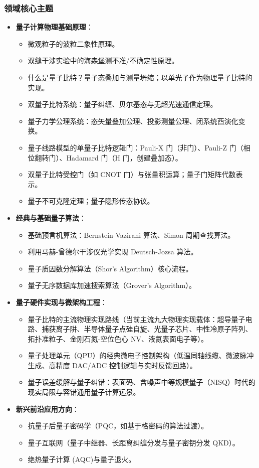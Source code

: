 \subsubsection{领域核心主题}
\begin{itemize}
    \item \textbf{量子计算物理基础原理}：
    \begin{itemize}
        \item 微观粒子的波粒二象性原理。
        \item 双缝干涉实验中的海森堡测不准/不确定性原理。
        \item 什么是量子比特？量子态叠加与测量坍缩；以单光子作为物理量子比特的实现。
        \item 双量子比特系统：量子纠缠、贝尔基态与无超光速通信定理。
        \item 量子力学公理系统：态矢量叠加公理、投影测量公理、闭系统酉演化变换。
        \item 量子线路模型的单量子比特逻辑门：Pauli-X 门（非门）、Pauli-Z 门（相位翻转门）、Hadamard 门（H 门，创建叠加态）。
        \item 双量子比特受控门（如 CNOT 门）与张量积运算；量子门矩阵代数表示。
        \item 量子不可克隆定理；量子隐形传态协议。
    \end{itemize}
    \item \textbf{经典与基础量子算法}：
    \begin{itemize}
        \item 基础预言机算法：Bernstein-Vazirani 算法、Simon 周期查找算法。
        \item 利用马赫-曾德尔干涉仪光学实现 Deutsch-Jozsa 算法。
        \item 量子质因数分解算法（Shor's Algorithm）核心流程。
        \item 量子无序数据库加速搜索算法（Grover's Algorithm）。
    \end{itemize}
    \item \textbf{量子硬件实现与微架构工程}：
    \begin{itemize}
        \item 量子比特的主流物理实现路线（当前主流九大物理实现载体：超导量子电路、捕获离子阱、半导体量子点硅自旋、光量子芯片、中性冷原子阵列、拓扑准粒子、金刚石氮-空位色心 NV、液氦表面电子等）。
        \item 量子处理单元（QPU）的经典微电子控制架构（低温同轴线缆、微波脉冲生成、高精度 DAC/ADC 控制逻辑与实时反馈回路）。
        \item 量子误差缓解与量子纠错：表面码、含噪声中等规模量子（NISQ）时代的现实局限与容错通用量子计算远景。
    \end{itemize}
    \item \textbf{新兴前沿应用方向}：
    \begin{itemize}
        \item 抗量子后量子密码学（PQC，如基于格密码的算法过渡）。
        \item 量子互联网（量子中继器、长距离纠缠分发与量子密钥分发 QKD）。
        \item 绝热量子计算 (AQC)与量子退火。
    \end{itemize}
\end{itemize}

